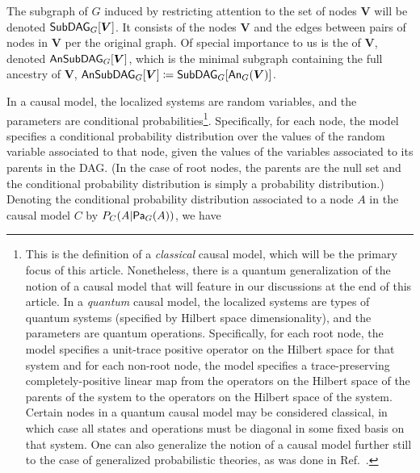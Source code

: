 The subgraph of $G$ induced by restricting attention to the set of nodes $\bm{V}$ will be denoted $\subgraph[G]{\bm{V}}$.
It consists of the nodes $\bm{V}$ and the edges between pairs of nodes in $\bm{V}$ per the original graph. Of special importance to us is the 
 of $\bm{V}$, denoted $\ansubgraph[G]{\bm{V}}$, which is the minimal subgraph containing the full ancestry of $\bm{V}$, $\ansubgraph[G]{\bm{V}}\coloneqq\subgraph[G]{\An[G]{\bm{V}}}$. 


In a causal model, the localized systems are random variables, and the parameters are conditional probabilities\footnote{This is the definition of a {\em classical}  causal model, which will be the primary focus of this article. Nonetheless, there is a quantum generalization of the notion of a causal model that will feature in our discussions at the end of this article.  In a {\em quantum} causal model\cite{leifer2013conditionalstates}, the localized systems are types of quantum systems (specified by Hilbert space dimensionality), and the parameters are quantum operations.  Specifically, for each root node, the model specifies a unit-trace positive operator on the Hilbert space for that system and for each non-root node, the model specifies a trace-preserving completely-positive linear map from the operators on the Hilbert space of the parents of the system to the operators on the Hilbert space of the system.  Certain nodes in a quantum causal model may be considered classical, in which case all states and operations must be diagonal in some fixed basis on that system.  One can also generalize the notion of a causal model further still to the case of generalized probabilistic theories, as was done in Ref.~\cite{pusey2014gdag}.
}.
Specifically, for each node, the model specifies a conditional probability distribution over the values of the random variable associated to that node, given the values of the variables associated to its parents in the DAG.  (In the case of root nodes, the parents are the null set and the conditional probability distribution is simply a probability distribution.)
Denoting the conditional probability distribution associated to a node $A$ in the causal model $C$ by $\pdf[C]{A|\Pa[G]{A}}$, we have

